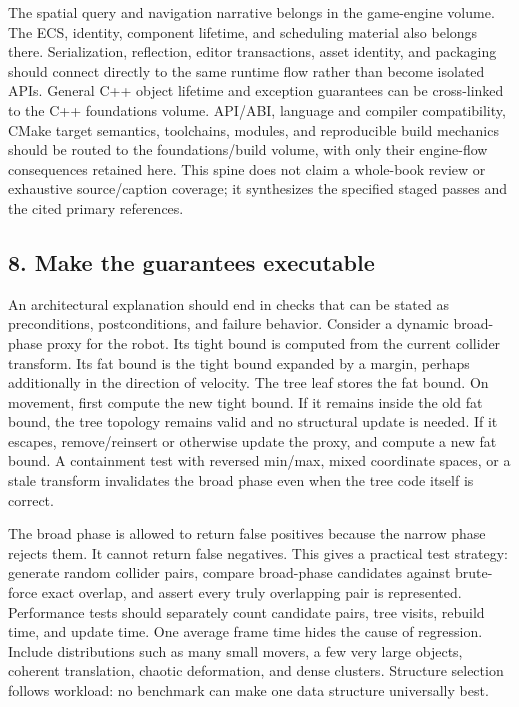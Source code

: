 \hypertarget{05-engine-i-ch008-scope-notes-for-integration}{}

The spatial query and navigation narrative belongs in the game-engine volume. The ECS, identity, component lifetime, and scheduling material also belongs there. Serialization, reflection, editor transactions, asset identity, and packaging should connect directly to the same runtime flow rather than become isolated APIs. General C++ object lifetime and exception guarantees can be cross-linked to the C++ foundations volume. API/ABI, language and compiler compatibility, CMake target semantics, toolchains, modules, and reproducible build mechanics should be routed to the foundations/build volume, with only their engine-flow consequences retained here. This spine does not claim a whole-book review or exhaustive source/caption coverage; it synthesizes the specified staged passes and the cited primary references.

\subsection{8. Make the guarantees executable}\label{05-engine-i-ch008-make-the-guarantees-executable}

\hypertarget{05-engine-i-ch008-make-the-guarantees-executable}{}

An architectural explanation should end in checks that can be stated as preconditions, postconditions, and failure behavior. Consider a dynamic broad-phase proxy for the robot. Its tight bound is computed from the current collider transform. Its fat bound is the tight bound expanded by a margin, perhaps additionally in the direction of velocity. The tree leaf stores the fat bound. On movement, first compute the new tight bound. If it remains inside the old fat bound, the tree topology remains valid and no structural update is needed. If it escapes, remove/reinsert or otherwise update the proxy, and compute a new fat bound. A containment test with reversed min/max, mixed coordinate spaces, or a stale transform invalidates the broad phase even when the tree code itself is correct.

The broad phase is allowed to return false positives because the narrow phase rejects them. It cannot return false negatives. This gives a practical test strategy: generate random collider pairs, compare broad-phase candidates against brute-force exact overlap, and assert every truly overlapping pair is represented. Performance tests should separately count candidate pairs, tree visits, rebuild time, and update time. One average frame time hides the cause of regression. Include distributions such as many small movers, a few very large objects, coherent translation, chaotic deformation, and dense clusters. Structure selection follows workload: no benchmark can make one data structure universally best.


